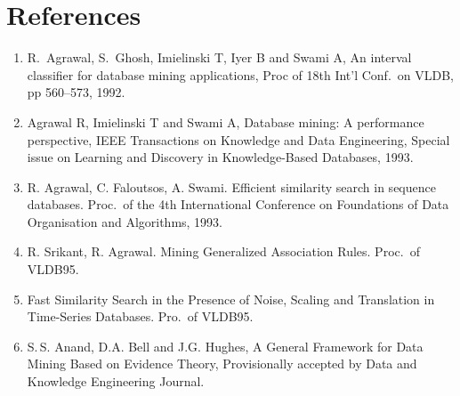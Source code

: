 \documentclass[a4paper,12pt,notitlepage,pdftex]{scrreprt}
\begin{document}
\chapter*{References}
    \begin{enumerate}
        \item R.~Agrawal, S.~Ghosh, Imielinski T, Iyer B and Swami A, An interval classifier for database mining
            applications, Proc of 18th Int'l Conf.\ on VLDB, pp 560--573, 1992.
        \item Agrawal R, Imielinski T and Swami A, Database mining: A performance perspective, IEEE Transactions on
            Knowledge and Data Engineering, Special issue on Learning and Discovery in Knowledge-Based Databases,
            1993.
        \item R. Agrawal, C. Faloutsos, A. Swami. Efficient similarity search in sequence databases. Proc.\ of the 4th
            International Conference on Foundations of Data Organisation and Algorithms, 1993.
        \item R. Srikant, R. Agrawal. Mining Generalized Association Rules. Proc.\ of VLDB95.
        \item Fast Similarity Search in the Presence of Noise, Scaling and Translation in Time-Series Databases. Pro.\
            of VLDB95.
        \item S.\,S. Anand, D.A. Bell and J.G. Hughes, A General Framework for Data Mining Based on Evidence Theory,
            Provisionally accepted by Data and Knowledge Engineering Journal.
    \end{enumerate}
\end{document}
